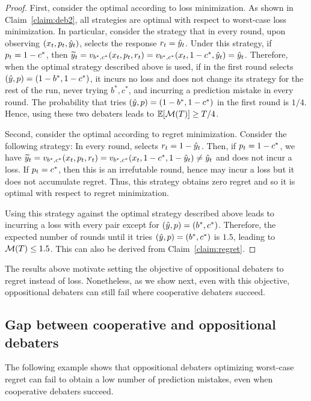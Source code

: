 \documentclass[11pt,letterpaper]{article}
\theoremstyle{definition}
\theoremstyle{plain}
\begin{document}
\begin{proof}
First, consider the optimal \df according to loss minimization. As shown in Claim~\ref{claim:deb2}, all \df strategies are optimal with respect to worst-case loss minimization. In particular, consider the strategy that in every round, upon observing $(x_t, {p}_t, {\hat{y}}_t)$, selects the response ${r}_t = {\hat{y}}_t$. Under this strategy, if ${p}_t = 1-c^*$, then ${\widetilde{y}}_t = v_{b^*,c^*}(x_t,{p}_t,{r}_t) = v_{b^*,c^*}(x_t,1-c^*,{\hat{y}}_t) = {\hat{y}}_t$. Therefore, when the optimal \dt strategy described above is used, if in the first round \dt selects $({\hat{y}},{p}) = (1-b^*,1-c^*)$, it incurs no loss and does not change its strategy for the rest of the run, never trying $b^*, c^*$, and incurring a prediction mistake in every round. The probability that \dt tries $({\hat{y}},{p}) = (1-b^*,1-c^*)$ in the first round is $1/4$. Hence, using these two debaters leads to $\mathbb{E}[{\mathcal M}(T)] \geq T/4$.

Second, consider the optimal \df according to regret minimization. Consider the following strategy: In every round, \df selects ${r}_t = 1-{\hat{y}}_t$. Then, if ${p}_t = 1-c^*$, we have ${\widetilde{y}}_t = v_{b^*,c^*}(x_t,{p}_t,{r}_t) = v_{b^*,c^*}(x_t,1-c^*,1-{\hat{y}}_t) \neq {\hat{y}}_t$ and \df does not incur a loss. If  ${p}_t = c^*$, then this is an irrefutable round, hence \df may incur a loss but it does not accumulate regret. Thus, this strategy obtains zero regret and so it is optimal with respect to regret minimization. 

Using this strategy against the optimal \dt strategy described above leads to \dt incurring a loss with every pair except for $({\hat{y}},{p}) = (b^*,c^*)$. Therefore, the expected number of rounds until it tries $({\hat{y}},{p}) = (b^*,c^*)$ is $1.5$, leading to ${\mathcal M}(T) \leq 1.5$. This can also be derived from Claim~\ref{claim:regret}.
\end{proof}

 The results above motivate setting the objective of oppositional debaters to regret instead of loss. Nonetheless, as we show next, even with this objective, oppositional debaters can still fail where cooperative debaters succeed.



\subsection{Gap between cooperative and oppositional debaters}

The following example shows that oppositional debaters optimizing worst-case regret can fail to obtain a low number of prediction mistakes, even when cooperative debaters succeed. 
\end{document}
